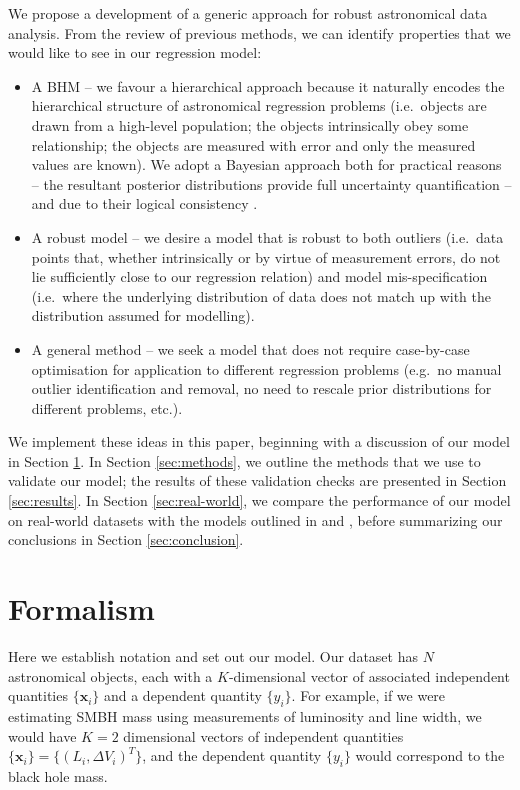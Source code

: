 \documentclass[fleqn,usenatbib]{rasti}
\begin{document}
We propose a development of a generic approach for robust astronomical data
analysis. From the review of previous methods, we can identify properties that
we would like to see in our regression model:

\begin{itemize}
	\item A BHM -- we favour a hierarchical approach
	because it naturally encodes the hierarchical structure of astronomical
	regression problems (i.e.\ objects are drawn from a high-level population;
	the objects intrinsically obey some relationship; the objects are measured
	with error and only the measured values are known). We adopt a Bayesian
	approach both for practical reasons -- the resultant posterior distributions provide full uncertainty quantification -- and due to their logical consistency \citep[e.g.][]{Cox:1946, vanHorn:2003, Knuth:2010}.

	\item A robust model -- we desire a model that is robust to both outliers
	(i.e.\ data points that, whether intrinsically or by virtue of measurement
	errors, do not lie sufficiently close to our regression relation) and model
	mis-specification (i.e.\ where the underlying distribution of data does not
	match up with the distribution assumed for modelling).

	\item A general method -- we seek a model that does not require case-by-case
	optimisation for application to different regression problems (e.g.\ no
	manual outlier identification and removal, no need to rescale prior
	distributions for different problems, etc.).
\end{itemize}

We implement these ideas in this paper, beginning with a discussion of our model
in Section \ref{sec:formalism}. In Section \ref{sec:methods}, we outline the
methods that we use to validate our model; the results of these validation
checks are presented in Section \ref{sec:results}. In Section
\ref{sec:real-world}, we compare the performance of our model on real-world
datasets with the models outlined in \citet{Kelly:2007} and \citet{Park:2017},
before summarizing our conclusions in Section \ref{sec:conclusion}.

\section{Formalism}
\label{sec:formalism}

Here we establish notation and set out our model. Our dataset has $N$
astronomical objects, each with a $K$-dimensional vector of associated
independent quantities $\{\boldsymbol{x}_i\}$ and a dependent quantity
$\{y_i\}$. For example, if we were estimating SMBH mass
using measurements of luminosity and line width, we would have $K = 2$
dimensional vectors of independent quantities $\{\boldsymbol{x}_i\} = \{(L_i, \Delta V_i)^T\}$, and the dependent quantity $\{y_i\}$ would
correspond to the black hole mass.
\end{document}
